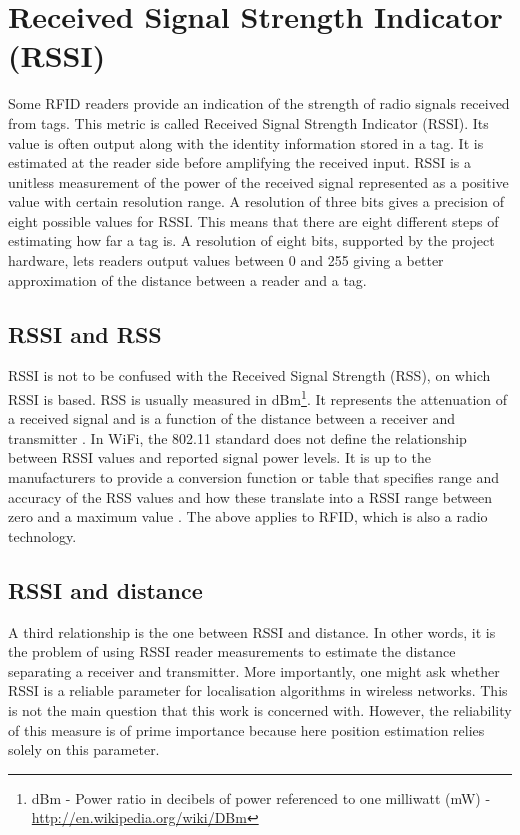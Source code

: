 \section{Received Signal Strength Indicator (RSSI)}
\label{sec:rssi}

Some RFID readers provide an indication of the strength of radio signals received from tags. This metric is called Received Signal Strength Indicator (RSSI). Its value is often output along with the identity information stored in a tag. It is estimated at the reader side before amplifying the received input. RSSI is a unitless measurement of the power of the received signal represented as a positive value with certain resolution range. A resolution of three bits gives a precision of eight possible values for RSSI. This means that there are eight different steps of estimating how far a tag is. A resolution of eight bits, supported by the project hardware, lets readers output values between 0 and 255 giving a better approximation of the distance between a reader and a tag. 

\subsection{RSSI and RSS}
\label{subsec:rssiandrss}

RSSI is not to be confused with the Received Signal Strength (RSS), on which RSSI is based. RSS is usually measured in dBm\footnote{dBm - Power ratio in decibels of power referenced to one milliwatt (mW) - \url{http://en.wikipedia.org/wiki/DBm}}. It represents the attenuation of a received signal and is a function of the distance between a receiver and transmitter \cite{Bouet2008}. In WiFi, the 802.11 standard does not define the relationship between RSSI values and reported signal power levels. It is up to the manufacturers to provide a conversion function or table that specifies range and accuracy of the RSS values and how these translate into a RSSI range between zero and a maximum value \cite{Lui2011}. The above applies to RFID, which is also a radio technology. 

\subsection{RSSI and distance}
\label{subsec:rsssianddist}

A third relationship is the one between RSSI and distance. In other words, it is the problem of using RSSI reader measurements to estimate the distance separating a receiver and transmitter. More importantly, one might ask whether RSSI is a reliable parameter for localisation algorithms in wireless networks. This is not the main question that this work is concerned with. However, the reliability of this measure is of prime importance because here position estimation relies solely on this parameter. 

